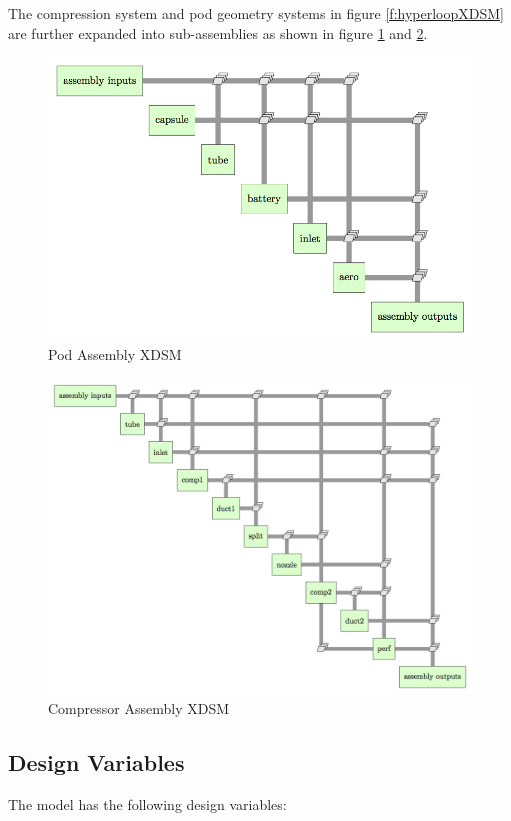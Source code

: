 \documentclass[heading.tex]{subfiles}
\begin{document}
The compression system and pod geometry systems in figure \ref{f:hyperloopXDSM} are further expanded into sub-assemblies as shown in figure \ref{f:podXDSM} and \ref{f:compressorXDSM}.

\begin{figure}[hbtp]
\centering
\includegraphics[scale=1]{images/pod_assembly_xdsm.png}
\caption{Pod Assembly XDSM}
\label{f:podXDSM}
\end{figure}

\begin{figure}[hbtp]
\centering
\includegraphics[scale=0.75]{images/compress_assembly_xdsm.png}
\caption{Compressor Assembly XDSM}
\label{f:compressorXDSM}
\end{figure}

\subsection{Design Variables}
The model has the following design variables:
\end{document}
